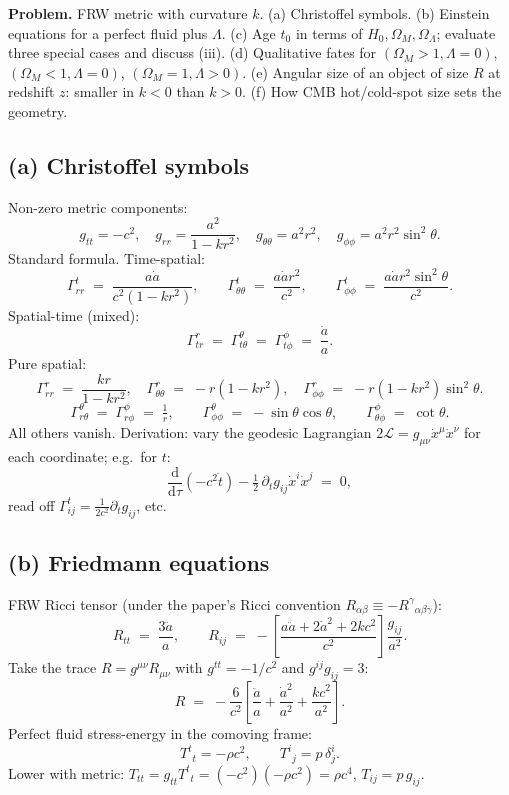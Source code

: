 \documentclass[11pt]{article}
\newcommand{\de}{\mathrm{d}}
\begin{document}
\textbf{Problem.} FRW metric with curvature $k$. (a) Christoffel symbols. (b) Einstein equations for a perfect fluid plus $\Lambda$. (c) Age $t_0$ in terms of $H_0,\Omega_M,\Omega_\Lambda$; evaluate three special cases and discuss (iii). (d) Qualitative fates for $(\Omega_M>1,\Lambda=0)$, $(\Omega_M<1,\Lambda=0)$, $(\Omega_M=1,\Lambda>0)$. (e) Angular size of an object of size $R$ at redshift $z$: smaller in $k<0$ than $k>0$. (f) How CMB hot/cold-spot size sets the geometry.

\subsection*{(a) Christoffel symbols}

Non-zero metric components:
\[
g_{tt}=-c^2,\quad g_{rr}=\frac{a^2}{1-kr^2},\quad g_{\theta\theta}=a^2 r^2,\quad g_{\phi\phi}=a^2 r^2\sin^2\theta.
\]
Standard formula. Time-spatial:
\[
\Gamma^t_{rr} \;=\; \frac{a\dot a}{c^2(1-kr^2)},\qquad \Gamma^t_{\theta\theta} \;=\; \frac{a\dot a r^2}{c^2},\qquad \Gamma^t_{\phi\phi} \;=\; \frac{a\dot a r^2\sin^2\theta}{c^2}.
\]
Spatial-time (mixed):
\[
\Gamma^r_{tr} \;=\; \Gamma^\theta_{t\theta} \;=\; \Gamma^\phi_{t\phi} \;=\; \frac{\dot a}{a}.
\]
Pure spatial:
\[
\Gamma^r_{rr} \;=\; \frac{kr}{1-kr^2},\quad \Gamma^r_{\theta\theta} \;=\; -r(1-kr^2),\quad \Gamma^r_{\phi\phi} \;=\; -r(1-kr^2)\sin^2\theta.
\]
\[
\Gamma^\theta_{r\theta} \;=\; \Gamma^\phi_{r\phi} \;=\; \tfrac{1}{r},\qquad \Gamma^\theta_{\phi\phi} \;=\; -\sin\theta\cos\theta,\qquad \Gamma^\phi_{\theta\phi} \;=\; \cot\theta.
\]
All others vanish. Derivation: vary the geodesic Lagrangian $2\mathcal L=g_{\mu\nu}\dot x^\mu\dot x^\nu$ for each coordinate; e.g.\ for $t$:
\[
\frac{\de}{\de\tau}(-c^2\dot t) - \tfrac12\,\partial_t g_{ij}\dot x^i\dot x^j \;=\; 0,
\]
read off $\Gamma^t_{ij}=\tfrac{1}{2c^2}\partial_t g_{ij}$, etc.

\subsection*{(b) Friedmann equations}

FRW Ricci tensor (under the paper's Ricci convention $R_{\alpha\beta}\equiv -R^\gamma{}_{\alpha\beta\gamma}$):
\[
R_{tt} \;=\; \frac{3\ddot a}{a},\qquad R_{ij} \;=\; -\!\left[\frac{a\ddot a + 2\dot a^2 + 2kc^2}{c^2}\right]\!\frac{g_{ij}}{a^2}.
\]
Take the trace $R=g^{\mu\nu}R_{\mu\nu}$ with $g^{tt}=-1/c^2$ and $g^{ij}g_{ij}=3$:
\[
R \;=\; -\frac{6}{c^2}\!\left[\frac{\ddot a}{a} + \frac{\dot a^2}{a^2} + \frac{kc^2}{a^2}\right].
\]
Perfect fluid stress-energy in the comoving frame:
\[
T^t{}_t=-\rho c^2,\qquad T^i{}_j=p\,\delta^i_j.
\]
Lower with metric: $T_{tt}=g_{tt}T^t{}_t=(-c^2)(-\rho c^2)=\rho c^4$, $T_{ij}=p\,g_{ij}$.
\end{document}
